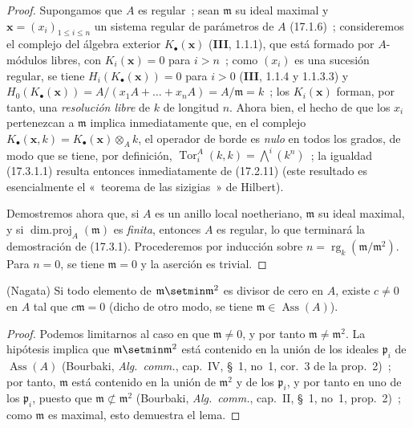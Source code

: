 \begin{proof}
Supongamos que $A$ es regular~; sean $\mathfrak{m}$ su ideal maximal y
$\mathbf{x}=(x_i)_{1\leq i\leq n}$ un sistema regular de parámetros de $A$
(17.1.6)~; consideremos el complejo del álgebra exterior
$K_\bullet(\mathbf{x})$ (\textbf{III}, 1.1.1), que está formado por $A$-módulos
libres, con $K_i(\mathbf{x})=0$ para $i>n$~; como $(x_i)$ es una sucesión
regular, se tiene $H_i(K_\bullet(\mathbf{x}))=0$ para $i>0$ (\textbf{III},
1.1.4 y 1.1.3.3) y
$H_0(K_\bullet(\mathbf{x}))=A/(x_1A+\ldots+x_nA)=A/\mathfrak{m}=k$~; los
$K_i(\mathbf{x})$ forman, por tanto, una \emph{resolución libre} de $k$ de
longitud $n$. Ahora bien, el hecho de que los $x_i$ pertenezcan a $\mathfrak{m}$
implica inmediatamente que, en el complejo
$K_\bullet(\mathbf{x},k)=K_\bullet(\mathbf{x})\otimes_A k$, el operador de borde
es \emph{nulo} en todos los grados, de modo que se tiene, por definición,
$\operatorname{Tor}^A_i(k,k)=\bigwedge^i(k^n)$~; la igualdad (17.3.1.1) resulta
entonces inmediatamente de (17.2.11) (este resultado es esencialmente el «~teorema de las
sizigias~» de Hilbert).

Demostremos ahora que, si $A$ es un anillo local noetheriano,
$\mathfrak{m}$ su ideal maximal, y si
$\operatorname{dim.proj}_A(\mathfrak{m})$ es \emph{finita}, entonces $A$ es
regular, lo que terminará la demostración de (17.3.1). Procederemos por
inducción sobre $n=\operatorname{rg}_k(\mathfrak{m}/\mathfrak{m}^2)$. Para
$n=0$, se tiene $\mathfrak{m}=0$ y la aserción es trivial.
\end{proof}

\begin{lemma}[17.3.1.2]
\label{0.17.3.1.2-es}
\textnormal{(Nagata)} Si todo elemento de
$\mathfrak m\setmin\mathfrak{m}^2$ es divisor de cero en $A$, existe
$c\neq0$ en $A$ tal que $c\mathfrak{m}=0$ (dicho de otro modo, se tiene
$\mathfrak{m}\in\operatorname{Ass}(A)$).
\end{lemma}

\begin{proof}
Podemos limitarnos al caso en que $\mathfrak{m}\neq0$, y por tanto
$\mathfrak{m}\neq\mathfrak{m}^2$. La hipótesis implica que
$\mathfrak m\setmin\mathfrak{m}^2$ está contenido en la unión de los ideales
$\mathfrak{p}_i$ de $\operatorname{Ass}(A)$ (Bourbaki,
\emph{Alg.~comm.}, cap.~IV, \S~1, no~1, cor.~3 de la prop.~2)~; por tanto,
$\mathfrak{m}$ está contenido en la unión de $\mathfrak{m}^2$
y de los $\mathfrak{p}_i$, y por tanto en uno de los $\mathfrak{p}_i$, puesto que
$\mathfrak{m}\not\subset\mathfrak{m}^2$ (Bourbaki, \emph{Alg.~comm.},
cap.~II, \S~1, no~1, prop.~2)~; como $\mathfrak{m}$ es maximal, esto demuestra el
lema.
\end{proof}

